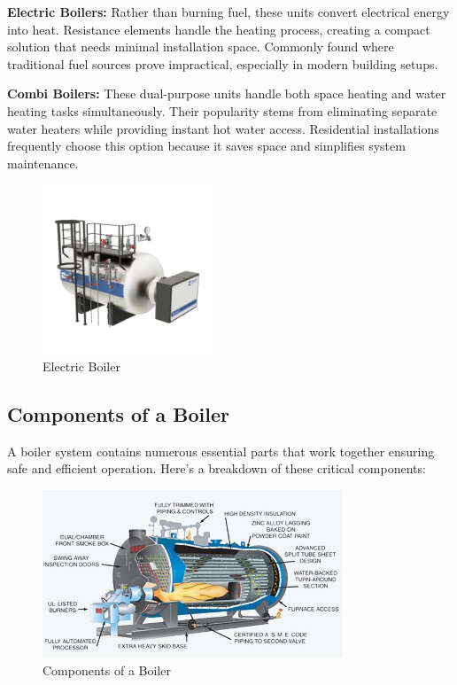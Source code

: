 \textbf{Electric Boilers:}
Rather than burning fuel, these units convert electrical energy into heat. Resistance elements handle the heating process, creating a compact solution that needs minimal installation space. Commonly found where traditional fuel sources prove impractical, especially in modern building setups.

\textbf{Combi Boilers:}
These dual-purpose units handle both space heating and water heating tasks simultaneously. Their popularity stems from eliminating separate water heaters while providing instant hot water access. Residential installations frequently choose this option because it saves space and simplifies system maintenance.
\begin{figure}[h]
\centering
\includegraphics[width=0.45\textwidth]{figs/lastmin/electric_steam_boiler.png}
\caption{Electric Boiler}
\label{fig:Electric Boiler}
\end{figure}

\subsection{Components of a Boiler}
A boiler system contains numerous essential parts that work together ensuring safe and efficient operation. Here's a breakdown of these critical components:

\begin{figure}[h]
\centering
\includegraphics[width=0.8\textwidth]{figs/lastmin/boiler_components.png}
\caption{Components of a Boiler}
\label{fig:boiler_components}
\end{figure}


